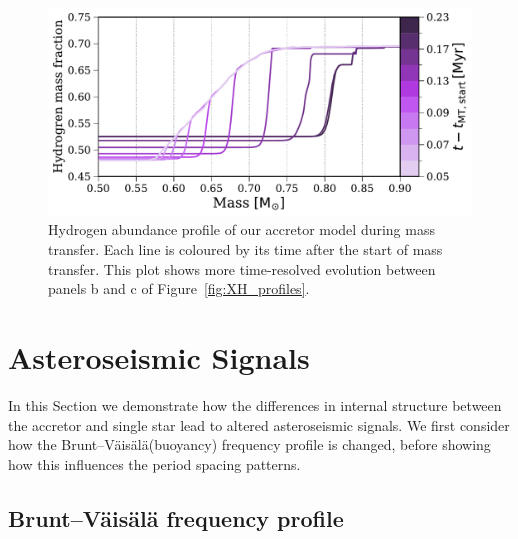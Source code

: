 \documentclass[twocolumn, twocolappendix, oneside]{aastex631}
\renewcommand{\bv}{Brunt–Väisälä\xspace}
\newcommand{\bvf}{Brunt–Väisälä frequency\xspace}
\begin{document}
\begin{figure}[tb]
    \centering
    \includegraphics[width=\columnwidth]{figures/XH_profile_zoom_MT.pdf}
    \caption{Hydrogen abundance profile of our accretor model during mass transfer. Each line is coloured by its time after the start of mass transfer. This plot shows more time-resolved evolution between panels b and c of Figure~\ref{fig:XH_profiles}.}
    \label{fig:X_H_zoom_MT}
\end{figure}

\section{Asteroseismic Signals} \label{sec:asteroseismic}

In this Section we demonstrate how the differences in internal structure between the accretor and single star lead to altered asteroseismic signals. We first consider how the \bv (buoyancy) frequency profile is changed, before showing how this influences the period spacing patterns.

\subsection{\bvf profile}\label{sec:bvf}
\end{document}
